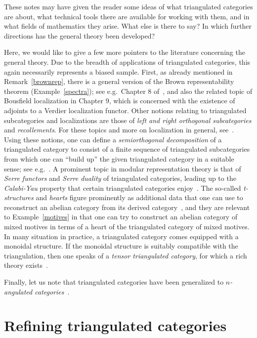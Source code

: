 \documentclass{amsproc}
\theoremstyle{definition}
\begin{document}
These notes may have given the reader some ideas of what triangulated categories are about, what technical tools there are available for working with them, and in what fields of mathematics they arise. What else is there to say? In which further directions has the general theory been developed?

Here, we would like to give a few more pointers to the literature concerning the general theory. Due to the breadth of applications of triangulated categories, this again necessarily represents a biased sample. First, as already mentioned in Remark~\ref{brownrep}, there is a general version of the Brown representability theorem (Example~\ref{spectra}); see e.g.~Chapter 8 of~\cite{Nee}, and also the related topic of Bousfield localization in Chapter 9, which is concerned with the existence of adjoints to a Verdier localization functor. Other notions relating to triangulated subcategories and localizations are those of \emph{left and right orthogonal subcategories} and \emph{recollements}. For these topics and more on localization in general, see~\cite{Krause}. Using these notions, one can define a \emph{semiorthogonal decomposition} of a triangulated category to consist of a finite sequence of triangulated subcategories from which one can ``build up'' the given triangulated category in a suitable sense; see e.g.~\cite{Orlov}. A prominent topic in modular representation theory is that of \emph{Serre functors} and \emph{Serre duality} of triangulated categories, leading up to the \emph{Calabi-Yau} property that certain triangulated categories enjoy~\cite{Keller}. The so-called \emph{t-structures} and \emph{hearts} figure prominently as additional data that one can use to reconstruct an abelian category from its derived category~\cite[IV.4]{GM}, and they are relevant to Example~\ref{motives} in that one can try to construct an abelian category of mixed motives in terms of a heart of the triangulated category of mixed motives. In many situation in practice, a triangulated category comes equipped with a monoidal structure. If the monoidal structure is suitably compatible with the triangulation, then one speaks of a \emph{tensor triangulated category}, for which a rich theory exists~\cite{Bal2}.

Finally, let us note that triangulated categories have been generalized to \emph{$n$-angulated categories}~\cite{nang}.

\section{Refining triangulated categories}
\label{refine}
\end{document}
